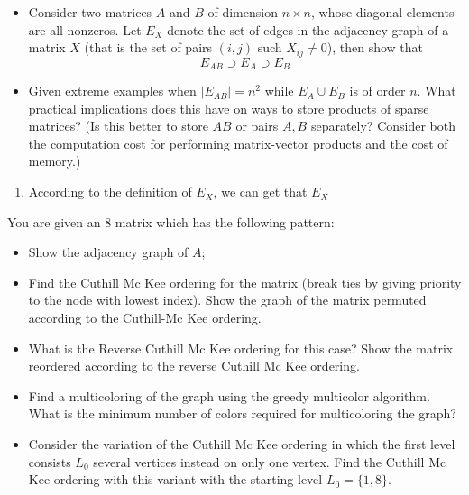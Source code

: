 \documentclass{ctexart}
\newif\ifpreface
\begin{document}
\large
\setlength{\baselineskip}{1.2em}
\ifpreface
    
\newgeometry{left=2cm,right=2cm,top=2cm,bottom=2cm}
\else
{}
\maketitle
\fi

\begin{problem} 
  \begin{itemize}
    \item   Consider two matrices \(A \) and \(B \) of dimension \(n \times n \), whose diagonal 
      elements are all nonzeros. Let \(E_X \) denote the set of edges in the 
      adjacency graph of a matrix \(X \) (that is the set of pairs \((i,j) \) 
      such \(  X_{ij} \neq 0\)), then show that \[
        E_{AB} \supset E_A \supset E_B
      \]
    \item Given extreme examples when \(|E_{AB}| =n^2 \) while \(E_A \cup E_B \) is of 
      order \(n \). What practical implications does this have on ways to store 
      products of sparse matrices? (Is this better to store \(AB \) or pairs \(A,B \) 
      separately? Consider both the computation cost for performing matrix-vector 
      products and the cost of memory.)
  \end{itemize}
\end{problem}
\begin{solution}
 \begin{enumerate}
   \item According to the definition of \(E_X \), we can get that \( E_X  \) 
 \end{enumerate}
  
\end{solution}

\begin{problem} 
  You are given an \(8 \) matrix which has the following pattern: 
  \begin{itemize}
    \item Show the adjacency graph of \(A \);
    \item Find the Cuthill Mc Kee ordering for the matrix (break ties by 
      giving priority to the node with lowest index). Show the graph of 
      the matrix permuted according to the Cuthill-Mc Kee ordering.
    \item What is the Reverse Cuthill Mc Kee ordering for this case? Show the matrix 
      reordered according to the reverse Cuthill Mc Kee ordering.
    \item Find a multicoloring of the graph using the greedy multicolor 
      algorithm. What is the minimum number of colors required for multicoloring 
      the graph? 
    \item Consider the variation of the Cuthill Mc Kee ordering in which the 
      first level consists \(L_0 \) several vertices instead on only one vertex. 
      Find the Cuthill Mc Kee ordering with this variant with the starting level 
      \(L_0 = \{1,8\} \).
  \end{itemize}
\end{problem}
  
\end{document}
